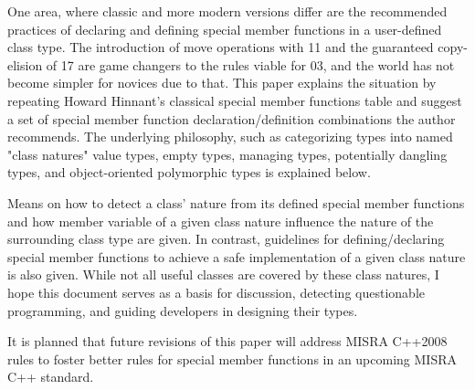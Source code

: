 \documentclass[ebook,11pt,article]{memoir}
\begin{document}
One area, where classic and more modern \Cpp{} versions differ are the recommended practices of declaring and defining special member functions in a user-defined class type. 
The introduction of move operations with \Cpp{}11 and the guaranteed copy-elision of \Cpp{}17 are game changers to the rules viable for \Cpp{}03, and the world has not become simpler for novices due to that. 
This paper explains the situation by repeating Howard Hinnant's classical special member functions table\cite{ACCU2014} and suggest a set of special member function declaration/definition combinations the author recommends. 
The underlying philosophy, such as categorizing types into named "class natures" value types, empty types, managing types, potentially dangling types, and object-oriented polymorphic types is explained below.

Means on how to detect a class' nature from its defined special member functions and how member variable of a given class nature influence the nature of the surrounding class type are given.
In contrast, guidelines for defining/declaring special member functions to achieve a safe implementation of a given class nature is also given. 
While not all useful classes are covered by these class natures, I hope this document serves as a basis for discussion, detecting questionable programming, and guiding developers in designing their types.

It is planned that future revisions of this paper will address MISRA C++2008 rules\cite{misra} to foster better rules for special member functions in an upcoming MISRA C++ standard.






\end{document}
